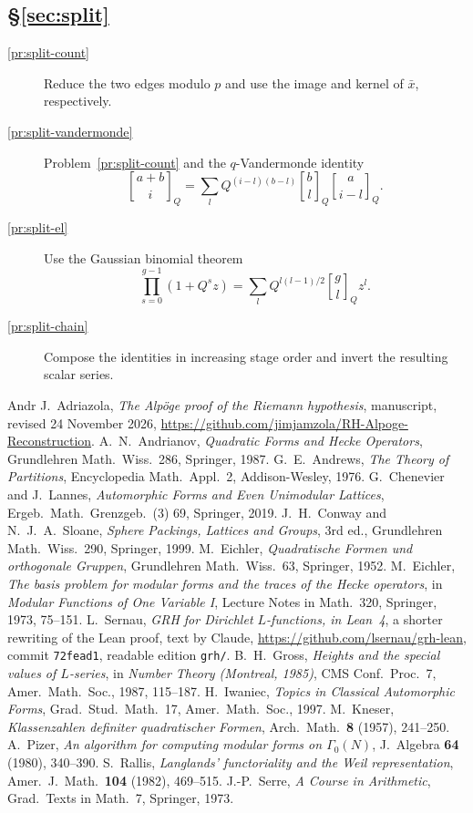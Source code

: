\documentclass[reqno]{amsart}
\theoremstyle{definition}
\theoremstyle{plain}
\newcommand{\qbinom}[3]{\genfrac{[}{]}{0pt}{}{#1}{#2}_{#3}}
\begin{document}
\subsection*{\S\ref{sec:split}}
\begin{description}
\item[\ref{pr:split-count}] Reduce the two edges modulo \(p\) and use the image and kernel of \(\bar x\), respectively.
\item[\ref{pr:split-vandermonde}] Problem~\ref{pr:split-count} and the \(q\)-Vandermonde identity \cite[Ch.~3]{Andr}\[\qbinom{a+b}{i}{Q} = \sum_l Q^{(i-l)(b-l)}\qbinom{b}{l}{Q}\qbinom{a}{i-l}{Q} .\]
\item[\ref{pr:split-el}] Use the Gaussian binomial theorem \[\prod_{s=0}^{g-1}(1 + Q^s z) = \sum_l Q^{l(l-1)/2}\qbinom{g}{l}{Q} z^l .\]
\item[\ref{pr:split-chain}] Compose the identities in increasing stage order and invert the resulting scalar series.
\end{description}

{\small\begin{thebibliography}{Andr}
 J.~Adriazola, \emph{The Alp\"oge proof of the Riemann hypothesis}, manuscript, revised 24 November 2026, \url{https://github.com/jimjamzola/RH-Alpoge-Reconstruction}.
 A.~N.~Andrianov, \emph{Quadratic Forms and Hecke Operators}, Grundlehren Math.\ Wiss.\ 286, Springer, 1987.
 G.~E.~Andrews, \emph{The Theory of Partitions}, Encyclopedia Math.\ Appl.\ 2, Addison-Wesley, 1976.
 G.~Chenevier and J.~Lannes, \emph{Automorphic Forms and Even Unimodular Lattices}, Ergeb.\ Math.\ Grenzgeb.\ (3) 69, Springer, 2019.
 J.~H.~Conway and N.~J.~A.~Sloane, \emph{Sphere Packings, Lattices and Groups}, 3rd ed., Grundlehren Math.\ Wiss.\ 290, Springer, 1999.
 M.~Eichler, \emph{Quadratische Formen und orthogonale Gruppen}, Grundlehren Math.\ Wiss.\ 63, Springer, 1952.
 M.~Eichler, \emph{The basis problem for modular forms and the traces of the Hecke operators}, in \emph{Modular Functions of One Variable I}, Lecture Notes in Math.\ 320, Springer, 1973, 75--151.
 L.~Sernau, \emph{GRH for Dirichlet \(L\)-functions, in Lean~4}, a shorter rewriting of the Lean proof, text by Claude, \url{https://github.com/lsernau/grh-lean}, commit \texttt{72fead1}, readable edition \texttt{grh/}.
 B.~H.~Gross, \emph{Heights and the special values of \(L\)-series}, in \emph{Number Theory (Montreal, 1985)}, CMS Conf.\ Proc.\ 7, Amer.\ Math.\ Soc., 1987, 115--187.
 H.~Iwaniec, \emph{Topics in Classical Automorphic Forms}, Grad.\ Stud.\ Math.\ 17, Amer.\ Math.\ Soc., 1997.
 M.~Kneser, \emph{Klassenzahlen definiter quadratischer Formen}, Arch.\ Math.\ \textbf{8} (1957), 241--250.
 A.~Pizer, \emph{An algorithm for computing modular forms on \(\Gamma_0(N)\)}, J.\ Algebra \textbf{64} (1980), 340--390.
 S.~Rallis, \emph{Langlands' functoriality and the Weil representation}, Amer.\ J.\ Math.\ \textbf{104} (1982), 469--515.
 J.-P.~Serre, \emph{A Course in Arithmetic}, Grad.\ Texts in Math.\ 7, Springer, 1973.
\end{thebibliography}}
\end{document}
